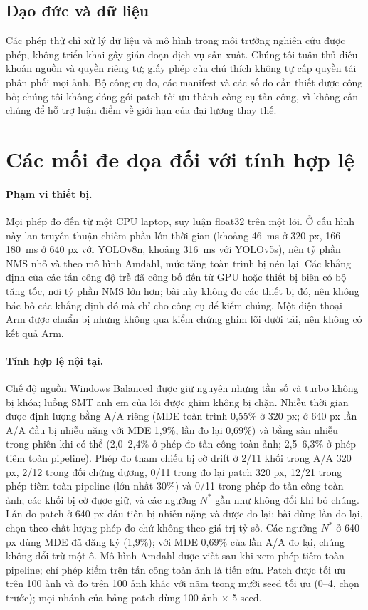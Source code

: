 \documentclass[a4paper,fleqn]{cas-dc}
\begin{document}
\subsection{Đạo đức và dữ liệu}
Các phép thử chỉ xử lý dữ liệu và mô hình trong môi trường nghiên cứu được phép, không triển khai gây gián đoạn dịch vụ sản xuất. Chúng tôi tuân thủ điều khoản nguồn và quyền riêng tư; giấy phép của chú thích không tự cấp quyền tái phân phối mọi ảnh. Bộ công cụ đo, các manifest và các số đo cần thiết được công bố; chúng tôi không đóng gói patch tối ưu thành công cụ tấn công, vì không cần chúng để hỗ trợ luận điểm về giới hạn của đại lượng thay thế.

\section{Các mối đe dọa đối với tính hợp lệ}
\label{sec:threats}
\paragraph{Phạm vi thiết bị.}
Mọi phép đo đến từ một CPU laptop, suy luận float32 trên một lõi. Ở cấu hình này lan truyền thuận chiếm phần lớn thời gian (khoảng 46~ms ở 320 px, 166--180~ms ở 640 px với YOLOv8n, khoảng 316~ms với YOLOv5s), nên tỷ phần NMS nhỏ và theo mô hình Amdahl, mức tăng toàn trình bị nén lại. Các khẳng định của các tấn công độ trễ đã công bố đến từ GPU hoặc thiết bị biên có bộ tăng tốc, nơi tỷ phần NMS lớn hơn; bài này không đo các thiết bị đó, nên không bác bỏ các khẳng định đó mà chỉ cho công cụ để kiểm chúng. Một điện thoại Arm được chuẩn bị nhưng không qua kiểm chứng ghim lõi dưới tải, nên không có kết quả Arm.
\paragraph{Tính hợp lệ nội tại.}
Chế độ nguồn Windows Balanced được giữ nguyên nhưng tần số và turbo không bị khóa; luồng SMT anh em của lõi được ghim không bị chặn. Nhiễu thời gian được định lượng bằng A/A riêng (MDE toàn trình 0,55\% ở 320 px; ở 640 px lần A/A đầu bị nhiễu nặng với MDE 1,9\%, lần đo lại 0,69\%) và bằng sàn nhiễu trong phiên khi có thể (2,0--2,4\% ở phép đo tấn công toàn ảnh; 2,5--6,3\% ở phép tiêm toàn pipeline). Phép đo tham chiếu bị cờ drift ở 2/11 khối trong A/A 320 px, 2/12 trong đối chứng dương, 0/11 trong đo lại patch 320 px, 12/21 trong phép tiêm toàn pipeline (lớn nhất 30\%) và 0/11 trong phép đo tấn công toàn ảnh; các khối bị cờ được giữ, và các ngưỡng $N^{*}$ gần như không đổi khi bỏ chúng. Lần đo patch ở 640 px đầu tiên bị nhiễu nặng và được đo lại; bài dùng lần đo lại, chọn theo chất lượng phép đo chứ không theo giá trị tỷ số. Các ngưỡng $N^{*}$ ở 640 px dùng MDE đã đăng ký (1,9\%); với MDE 0,69\% của lần A/A đo lại, chúng không đổi trừ một ô. Mô hình Amdahl được viết sau khi xem phép tiêm toàn pipeline; chỉ phép kiểm trên tấn công toàn ảnh là tiến cứu. Patch được tối ưu trên 100 ảnh và đo trên 100 ảnh khác với năm trong mười seed tối ưu (0--4, chọn trước); mọi nhánh của bảng patch dùng 100 ảnh $\times$ 5 seed.
\end{document}
